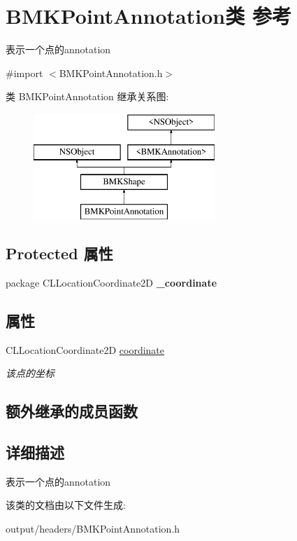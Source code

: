 \hypertarget{interface_b_m_k_point_annotation}{}\section{B\+M\+K\+Point\+Annotation类 参考}
\label{interface_b_m_k_point_annotation}


表示一个点的annotation  




{\ttfamily \#import $<$B\+M\+K\+Point\+Annotation.\+h$>$}

类 B\+M\+K\+Point\+Annotation 继承关系图\+:\begin{figure}[H]
\begin{center}
\leavevmode
\includegraphics[height=4.000000cm]{interface_b_m_k_point_annotation}
\end{center}
\end{figure}
\subsection*{Protected 属性}
\begin{DoxyCompactItemize}
\item 
\hypertarget{interface_b_m_k_point_annotation_affd501bbf19fb485a6bd7e0e49c9a144}{}package C\+L\+Location\+Coordinate2\+D {\bfseries \+\_\+coordinate}\label{interface_b_m_k_point_annotation_affd501bbf19fb485a6bd7e0e49c9a144}

\end{DoxyCompactItemize}
\subsection*{属性}
\begin{DoxyCompactItemize}
\item 
\hypertarget{interface_b_m_k_point_annotation_a4434c998ea13f0c029eb944312611091}{}C\+L\+Location\+Coordinate2\+D \hyperlink{interface_b_m_k_point_annotation_a4434c998ea13f0c029eb944312611091}{coordinate}\label{interface_b_m_k_point_annotation_a4434c998ea13f0c029eb944312611091}

\begin{DoxyCompactList}\small\item\em 该点的坐标 \end{DoxyCompactList}\end{DoxyCompactItemize}
\subsection*{额外继承的成员函数}


\subsection{详细描述}
表示一个点的annotation 

该类的文档由以下文件生成\+:\begin{DoxyCompactItemize}
\item 
output/headers/B\+M\+K\+Point\+Annotation.\+h\end{DoxyCompactItemize}
